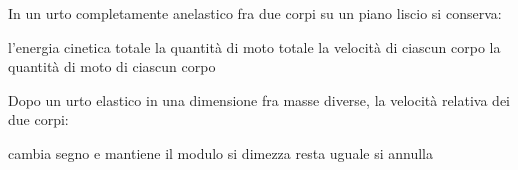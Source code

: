 \documentclass[a4paper,10pt]{exam}
\begin{document}
\begin{questions}
\question In un urto completamente anelastico fra due corpi su un piano liscio si conserva:
\vspace{0.2em}
\begin{choices}
\choice l'energia cinetica totale
\choice la quantità di moto totale
\choice la velocità di ciascun corpo
\choice la quantità di moto di ciascun corpo
\end{choices}

\question Dopo un urto elastico in una dimensione fra masse diverse, la velocità relativa dei due corpi:
\vspace{0.2em}
\begin{choices}
\choice cambia segno e mantiene il modulo
\choice si dimezza
\choice resta uguale
\choice si annulla
\end{choices}

\end{questions}
\end{document}
